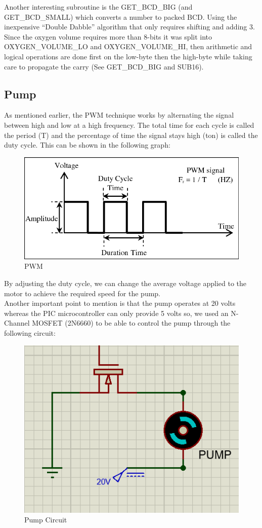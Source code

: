 \documentclass[a4paper, 12pt]{article}
\begin{document}
Another interesting subroutine is the GET\_BCD\_BIG (and GET\_BCD\_SMALL) which converts a number to packed BCD. Using the inexpensive “Double Dabble” algorithm that only requires shifting and adding 3. \\

Since the oxygen volume requires more than 8-bits it was split into OXYGEN\_VOLUME\_LO and OXYGEN\_VOLUME\_HI, then arithmetic and logical operations are done first on the low-byte then the high-byte while taking care to propagate the carry (See GET\_BCD\_BIG and SUB16).

\newpage

\subsection{Pump}
As mentioned earlier, the PWM technique works by alternating the signal between high and low at a high frequency. The total time for each cycle is called the period (T) and the percentage of time the signal stays high (ton) is called the duty cycle. This can be shown in the following graph:

\begin{figure}[H]
\centering
\includegraphics[width=0.8\linewidth]{images/PWM}
\caption{PWM}
\end{figure}

By adjusting the duty cycle, we can change the average voltage applied to the motor to achieve the required speed for the pump.  \\

Another important point to mention is that the pump operates at 20 volts whereas the PIC microcontroller can only provide 5 volts so, we used an N-Channel MOSFET (2N6660) to be able to control the pump through the following circuit:

\begin{figure}[H]
\centering
\includegraphics[width=0.5\linewidth]{images/MOSFET}
\caption{Pump Circuit}
\end{figure}
\end{document}
